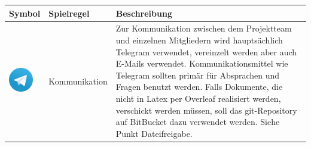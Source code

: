 \begingroup
\renewcommand*{\arraystretch}{1.1} %
\begin{center}
\begin{scriptsize}
\begin{tabularx}{\textwidth}{|p{3cm}|p{3cm}|X|}
    \hline
    \rowcolor{gray} \normalsize \color{white} \textbf{Symbol} & \color{white} \normalsize \textbf{Spielregel} & \color{white} \normalsize \textbf{Beschreibung} \\
    \hline
    \multirow{4}{*}{\begin{minipage}{3cm}
    \begin{center}
        \vspace{0.5cm}
        \includegraphics[width=40]{images/sr/1.png}
    \end{center}
    \end{minipage}} & Kommunikation 
    & Zur Kommunikation zwischen dem Projektteam und
    einzelnen Mitgliedern wird hauptsächlich Telegram
    verwendet, vereinzelt werden aber auch E-Mails
    verwendet. Kommunikationsmittel wie Telegram sollten
    primär für Absprachen und Fragen benutzt werden. Falls Dokumente, die nicht in Latex per Overleaf realisiert werden, verschickt werden müssen, soll das \gls{git}-Repository auf BitBucket dazu verwendet werden. Siehe Punkt Dateifreigabe. \\

\end{tabularx}
\end{scriptsize}
\end{center}
